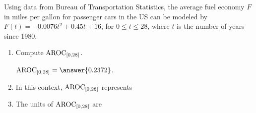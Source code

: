 \documentclass{ximera}
\author{Kenneth Berglund}
\begin{document}
\licenseSZ
\begin{exercise}

Using data from Bureau of Transportation Statistics, the average fuel economy $F$ in miles per gallon for passenger cars in the US can be modeled by $F(t) = -0.0076t^2 + 0.45t + 16$, for $0 \le t \le 28$, where $t$ is the number of years since 1980.

\begin{enumerate}
\item Compute $\mathrm{AROC}_{[0, 28]}$.

$\av_{[0, 28]} = \answer{0.2372}$.

\item In this context, $\mathrm{AROC}_{[0, 28]}$ represents
\begin{multipleChoice}
\end{multipleChoice}

\item The units of $\mathrm{AROC}_{[0, 28]}$ are
\begin{multipleChoice}
\end{multipleChoice}
\end{enumerate}



\end{exercise}
\end{document}
